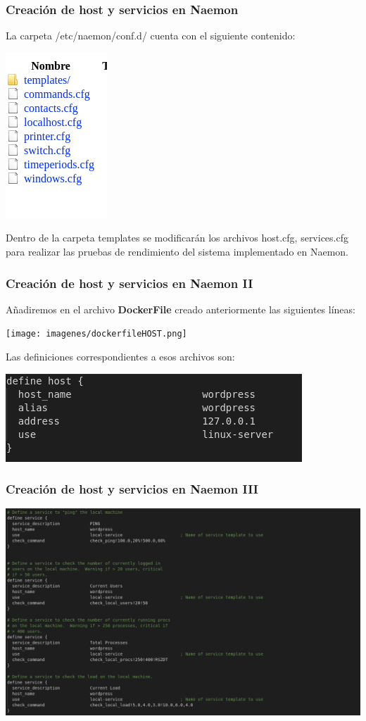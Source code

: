 \documentclass{beamer}
\theoremstyle{plain}
\theoremstyle{definition}
\theoremstyle{plain}
\theoremstyle{definition}
\theoremstyle{remark}
\theoremstyle{definition}
\begin{document}
\begin{frame}
	\frametitle{Creación de host y servicios en Naemon}
	La carpeta /etc/naemon/conf.d/ cuenta con el siguiente contenido:
		
	\centering
	\includegraphics[scale=0.3]{imagenes/confd.png}
	
	Dentro de la carpeta templates se modificarán los archivos host.cfg, services.cfg para realizar las pruebas de rendimiento del sistema implementado en Naemon.
	
\end{frame}
\begin{frame}
	\frametitle{Creación de host y servicios en Naemon II}
	Añadiremos en el archivo \textbf{DockerFile} creado anteriormente las siguientes líneas:

	\centering
	\texttt{[image: imagenes/dockerfileHOST.png]}
	
	Las definiciones correspondientes a esos archivos son:
	
	\includegraphics[scale=0.2]{imagenes/analisis_naemon/host.png}

	
\end{frame}
\begin{frame}
	\frametitle{Creación de host y servicios en Naemon III}
	
	
	\centering
	\includegraphics[scale=0.25]{imagenes/analisis_naemon/services1.png}

	
\end{frame}
\end{document}
